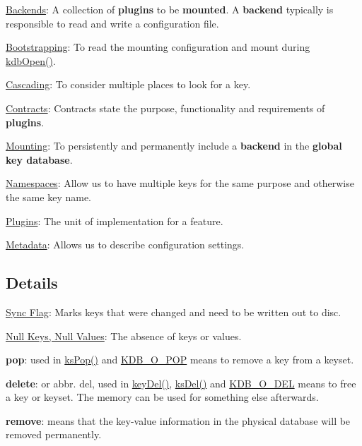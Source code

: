 \begin{DoxyItemize}
\item \hyperlink{doc_help_elektra-backends_md}{Backends}\+: A collection of {\bfseries plugins} to be {\bfseries mounted}. A {\bfseries backend} typically is responsible to read and write a configuration file.
\item \hyperlink{doc_help_elektra-bootstrapping_md}{Bootstrapping}\+: To read the mounting configuration and mount during {\ttfamily \hyperlink{group__kdb_ga6808defe5870f328dd17910aacbdc6ca}{kdb\+Open()}}.
\item \hyperlink{doc_help_elektra-cascading_md}{Cascading}\+: To consider multiple places to look for a key.
\item \hyperlink{doc_help_elektra-contracts_md}{Contracts}\+: Contracts state the purpose, functionality and requirements of {\bfseries plugins}.
\item \hyperlink{doc_help_elektra-mounting_md}{Mounting}\+: To persistently and permanently include a {\bfseries backend} in the {\bfseries global key database}.
\item \hyperlink{doc_help_elektra-namespaces_md}{Namespaces}\+: Allow us to have multiple keys for the same purpose and otherwise the same key name.
\item \hyperlink{src_plugins_README_md}{Plugins}\+: The unit of implementation for a feature.
\item \hyperlink{doc_help_elektra-metadata_md}{Metadata}\+: Allows us to describe configuration settings.
\end{DoxyItemize}

\subsection*{Details}


\begin{DoxyItemize}
\item \hyperlink{doc_help_elektra-sync-flag_md}{Sync Flag}\+: Marks keys that were changed and need to be written out to disc.
\item \hyperlink{doc_help_elektra-values_md}{Null Keys, Null Values}\+: The absence of keys or values.
\item {\bfseries pop}\+: used in {\ttfamily \hyperlink{group__keyset_gae42530b04defb772059de0600159cf69}{ks\+Pop()}} and \hyperlink{group__keyset_gga98a3d6a4016c9dad9cbd1a99a9c2a45aa52fb5f2cc86773d393da62bebebf7984}{K\+D\+B\+\_\+\+O\+\_\+\+P\+OP} means to remove a key from a keyset.
\item {\bfseries delete}\+: or abbr. del, used in {\ttfamily \hyperlink{group__key_ga3df95bbc2494e3e6703ece5639be5bb1}{key\+Del()}}, {\ttfamily \hyperlink{group__keyset_ga27e5c16473b02a422238c8d970db7ac8}{ks\+Del()}} and \hyperlink{group__keyset_gga98a3d6a4016c9dad9cbd1a99a9c2a45aa66a5380c120f25f28f49848c4a863ead}{K\+D\+B\+\_\+\+O\+\_\+\+D\+EL} means to free a key or keyset. The memory can be used for something else afterwards.
\item {\bfseries remove}\+: means that the key-\/value information in the physical database will be removed permanently. 
\end{DoxyItemize}
